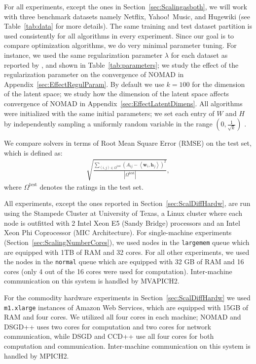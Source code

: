 \documentclass{vldb}
\newcommand{\hb}{\mathbf{h}}
\newcommand{\wb}{\mathbf{w}}
\newcommand{\rbr}[1]{\left(#1\right)}
\newcommand{\abr}[1]{\left|#1\right|}
\newcommand{\inner}[2]{\left\langle #1,#2 \right\rangle}
\begin{document}
For all experiments, except the ones in Section~\ref{sec:Scalingasboth},
we will work with three benchmark datasets namely Netflix, Yahoo!\
Music, and Hugewiki (see Table~\ref{tab:data} for more details).  The
same training and test dataset partition is used consistently for all
algorithms in every experiment. Since our goal is to compare
optimization algorithms, we do very minimal parameter tuning. For
instance, we used the same regularization parameter $\lambda$ for each
dataset as reported by \citet{YuHsiSiDhi12}, and shown in
Table~\ref{tab:parameters}; we study the effect of the regularization
parameter on the convergence of NOMAD in
Appendix~\ref{sec:EffectRegulParam}.  By default we use $k = 100$ for
the dimension of the latent space; we study how the dimension of the
latent space affects convergence of NOMAD in
Appendix~\ref{sec:EffectLatentDimens}.  All algorithms were initialized
with the same initial parameters; we set each entry of $W$ and $H$ by
independently sampling a uniformly random variable in the range
$(0,\frac 1 {\sqrt{k}})$ \citep{YuHsiSiDhi12, ZhuChiJuaLin13}.

We compare solvers in terms of Root Mean Square Error (RMSE) on the test
set, which is defined as:
\begin{align*}
  \sqrt{\frac{\sum_{(i,j) \in \Omega^{\text{test}}} \rbr{A_{ij} -
        \inner{\wb_i}{\hb_j}}^2}
    {\abr{\Omega^{\text{test}}}}},
\end{align*}
where $\Omega^{\text{test}}$ denotes the ratings in the test set.

All experiments, except the ones reported in
Section~\ref{sec:ScalDiffHardw}, are run using the Stampede Cluster at
University of Texas, a Linux cluster where each node is outfitted with
2 Intel Xeon E5 (Sandy Bridge) processors and an Intel Xeon Phi
Coprocessor (MIC Architecture).  For single-machine experiments
(Section~\ref{sec:ScalingNumberCores}), we used nodes in the
\texttt{largemem} queue which are equipped with 1TB of RAM and 32
cores. For all other experiments, we used the nodes in the
\texttt{normal} queue which are equipped with 32 GB of RAM and 16
cores (only 4 out of the 16 cores were used for computation).
Inter-machine communication on this system is handled by MVAPICH2.

For the commodity hardware experiments in
Section~\ref{sec:ScalDiffHardw} we used \texttt{m1.xlarge} instances of
Amazon Web Services, which are equipped with 15GB of RAM and four cores.
We utilized all four cores in each machine; NOMAD and DSGD++ uses two
cores for computation and two cores for network communication, while
DSGD and CCD++ use all four cores for both computation and
communication.  Inter-machine communication on this system is handled by
MPICH2.
\end{document}
